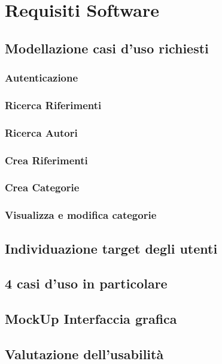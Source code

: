 \chapter{Requisiti Software}
\raggedright{\section{Modellazione casi d'uso richiesti}}
\raggedright{\subsection{Autenticazione}}
\raggedright{\subsection{Ricerca Riferimenti}}
\raggedright{\subsection{Ricerca Autori}}
\raggedright{\subsection{Crea Riferimenti}}
\raggedright{\subsection{Crea Categorie}}
\raggedright{\subsection{Visualizza e modifica categorie}}






\raggedright{\section{Individuazione target degli utenti}}

\raggedright{\section{4 casi d'uso in particolare}}

\raggedright{\section{MockUp Interfaccia grafica}}

\raggedright{\section{Valutazione dell'usabilità}}

